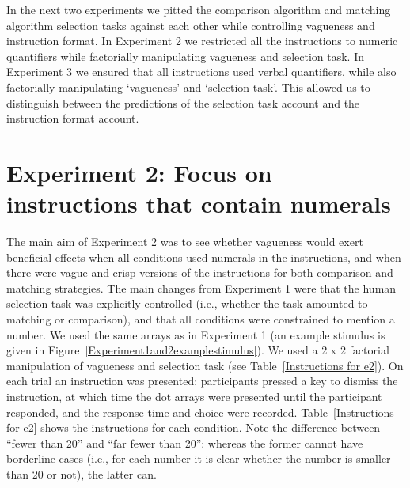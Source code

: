 \documentclass[ %
  graybox       %
 ,envcountchap  %
 ,sectrefs      %
]{svmono}
\begin{document}
In the next two experiments we pitted the comparison algorithm and matching algorithm selection tasks against each other while controlling vagueness and instruction format. In Experiment 2 we restricted all the instructions to numeric quantifiers while factorially manipulating vagueness and selection task. In Experiment 3 we ensured that all instructions used verbal quantifiers, while also factorially manipulating `vagueness' and `selection task'. This allowed us to distinguish between the predictions of the selection task account and the instruction format account.

\section{Experiment 2: Focus on instructions that contain numerals}
The main aim of Experiment 2 was to see whether vagueness would exert beneficial effects when all conditions used numerals in the instructions, and when there were vague and crisp versions of the instructions for both comparison and matching strategies. The main changes from Experiment 1 were that the human selection task was explicitly controlled (i.e., whether the task amounted to matching or comparison), and that all conditions were constrained to mention a number. We used the same arrays as in Experiment 1 (an example stimulus is given in Figure~\ref{Experiment1and2examplestimulus}). We used a 2 x 2 factorial manipulation of vagueness and selection task (see Table~\ref{Instructions for e2}). On each trial an instruction was presented: participants pressed a key to dismiss the instruction, at which time the dot arrays were presented until the participant responded, and the response time and choice were recorded. Table~\ref{Instructions for e2} shows the instructions for each condition. Note the difference between ``fewer than 20'' and ``far fewer than 20'': whereas the former cannot have borderline cases (i.e., for each number it is clear whether the number is smaller than 20 or not), the latter can.
\end{document}
